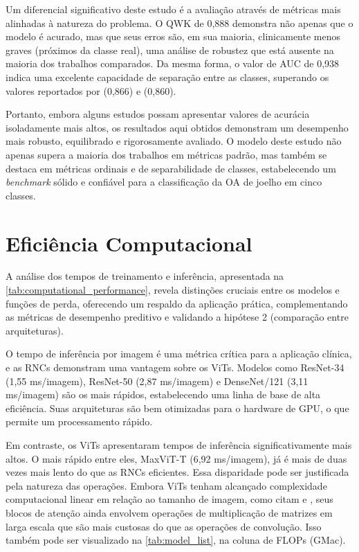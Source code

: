 Um diferencial significativo deste estudo é a avaliação através de métricas mais alinhadas à natureza do problema. O QWK de 0,888 demonstra não apenas que o modelo é acurado, mas que seus erros são, em sua maioria, clinicamente menos graves (próximos da classe real), uma análise de robustez que está ausente na maioria dos trabalhos comparados. Da mesma forma, o valor de AUC de 0,938 indica uma excelente capacidade de separação entre as classes, superando os valores reportados por  (0,866) e  (0,860).

Portanto, embora alguns estudos possam apresentar valores de acurácia isoladamente mais altos, os resultados aqui obtidos demonstram um desempenho mais robusto, equilibrado e rigorosamente avaliado. O modelo deste estudo não apenas supera a maioria dos trabalhos em métricas padrão, mas também se destaca em métricas ordinais e de separabilidade de classes, estabelecendo um \textit{benchmark} sólido e confiável para a classificação da OA de joelho em cinco classes.

\section{Eficiência Computacional}

A análise dos tempos de treinamento e inferência, apresentada na \autoref{tab:computational_performance}, revela distinções cruciais entre os modelos e funções de perda, oferecendo um respaldo da aplicação prática, complementando as métricas de desempenho preditivo e validando a hipótese 2 (comparação entre arquiteturas).

O tempo de inferência por imagem é uma métrica crítica para a aplicação clínica, e as RNCs demonstram uma vantagem sobre os ViTs. Modelos como ResNet-34 (1,55 ms/imagem), ResNet-50 (2,87 ms/imagem) e DenseNet/121 (3,11 ms/imagem) são os mais rápidos, estabelecendo uma linha de base de alta eficiência. Suas arquiteturas são bem otimizadas para o hardware de GPU, o que permite um processamento rápido.

Em contraste, os ViTs apresentaram tempos de inferência significativamente mais altos. O mais rápido entre eles, MaxViT-T (6,92 ms/imagem), já é mais de duas vezes mais lento do que as RNCs eficientes. Essa disparidade pode ser justificada pela natureza das operações. Embora ViTs tenham alcançado complexidade computacional linear em relação ao tamanho de imagem, como citam  e , seus blocos de atenção ainda envolvem operações de multiplicação de matrizes em larga escala que são mais custosas do que as operações de convolução. Isso também pode ser visualizado na \autoref{tab:model_list}, na coluna de FLOPs (GMac).

